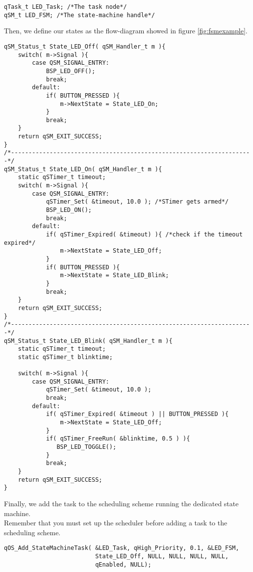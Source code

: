 \begin{lstlisting}[style=CStyle]
qTask_t LED_Task; /*The task node*/
qSM_t LED_FSM; /*The state-machine handle*/
\end{lstlisting}

Then, we define our states as the flow-diagram showed in figure \ref{fig:fsmexample}.

\begin{lstlisting}[style=CStyle]
qSM_Status_t State_LED_Off( qSM_Handler_t m ){
    switch( m->Signal ){
        case QSM_SIGNAL_ENTRY:
            BSP_LED_OFF();
            break;
        default:
            if( BUTTON_PRESSED ){
                m->NextState = State_LED_On;
            }
            break;
    }
    return qSM_EXIT_SUCCESS;
}
/*---------------------------------------------------------------------*/
qSM_Status_t State_LED_On( qSM_Handler_t m ){
    static qSTimer_t timeout;
    switch( m->Signal ){
        case QSM_SIGNAL_ENTRY:
            qSTimer_Set( &timeout, 10.0 ); /*STimer gets armed*/
            BSP_LED_ON();
            break;
        default:
            if( qSTimer_Expired( &timeout) ){ /*check if the timeout expired*/
                m->NextState = State_LED_Off;
            }
            if( BUTTON_PRESSED ){
                m->NextState = State_LED_Blink;
            }
            break;
    }
    return qSM_EXIT_SUCCESS;
}
/*---------------------------------------------------------------------*/
qSM_Status_t State_LED_Blink( qSM_Handler_t m ){
    static qSTimer_t timeout;
    static qSTimer_t blinktime;
    
    switch( m->Signal ){
        case QSM_SIGNAL_ENTRY:
            qSTimer_Set( &timeout, 10.0 );
            break;
        default:
            if( qSTimer_Expired( &timeout ) || BUTTON_PRESSED ){
                m->NextState = State_LED_Off;
            }
            if( qSTimer_FreeRun( &blinktime, 0.5 ) ){
               BSP_LED_TOGGLE();
            }
            break;
    }
    return qSM_EXIT_SUCCESS;
}
\end{lstlisting}

Finally, we add the task to the scheduling scheme running the dedicated state machine. \\

Remember that you must set up the scheduler before adding a task to the scheduling scheme. \\

\begin{lstlisting}[style=CStyle]
qOS_Add_StateMachineTask( &LED_Task, qHigh_Priority, 0.1, &LED_FSM,
                          State_LED_Off, NULL, NULL, NULL, NULL,
                          qEnabled, NULL);
\end{lstlisting}

